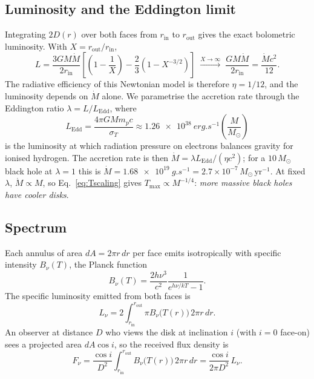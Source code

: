 \documentclass[11pt,a4paper]{article}
\newcommand{\Msun}{M_\odot}
\newcommand{\Mdot}{\dot M}
\newcommand{\LEdd}{L_{\mathrm{Edd}}}
\newcommand{\rin}{r_{\mathrm{in}}}
\newcommand{\rout}{r_{\mathrm{out}}}
\newcommand{\Tmax}{T_{\max}}
\begin{document}
\subsection{Luminosity and the Eddington limit}
Integrating $2D(r)$ over both faces from $\rin$ to $\rout$ gives the exact
bolometric luminosity. With $X=\rout/\rin$,
\begin{equation}
  L=\frac{3GM\Mdot}{2\rin}\left[\left(1-\frac{1}{X}\right)-\frac{2}{3}\left(1-X^{-3/2}\right)\right]
  \;\xrightarrow{X\to\infty}\;\frac{GM\Mdot}{2\rin}=\frac{\Mdot c^2}{12}.
  \label{eq:Lanalytic}
\end{equation}
The radiative efficiency of this Newtonian model is therefore $\eta=1/12$,
and the luminosity depends on $\Mdot$ alone. We parametrise the accretion
rate through the Eddington ratio $\lambda=L/\LEdd$, where
\begin{equation}
  \LEdd=\frac{4\pi GMm_pc}{\sigma_T}\approx\SI{1.26e38}{erg.s^{-1}}\left(\frac{M}{\Msun}\right)
\end{equation}
is the luminosity at which radiation pressure on electrons balances gravity
for ionised hydrogen. The accretion rate is then
$\Mdot=\lambda\LEdd/(\eta c^2)$; for a $10\,\Msun$ black hole at
$\lambda=1$ this is $\Mdot=\SI{1.68e19}{g.s^{-1}}=2.7\times10^{-7}\,\Msun\,\mathrm{yr}^{-1}$.
At fixed $\lambda$, $\Mdot\propto M$, so Eq.~\eqref{eq:Tscaling} gives
$\Tmax\propto M^{-1/4}$: \emph{more massive black holes have cooler disks}.

\subsection{Spectrum}
Each annulus of area $dA=2\pi r\,dr$ per face emits isotropically with
specific intensity $B_\nu(T)$, the Planck function \citep{RybickiLightman1979}
\begin{equation}
  B_\nu(T)=\frac{2h\nu^3}{c^2}\frac{1}{e^{h\nu/kT}-1}.
\end{equation}
The specific luminosity emitted from both faces is
\begin{equation}
  L_\nu=2\int_{\rin}^{\rout}\pi B_\nu\bigl(T(r)\bigr)\,2\pi r\,dr.
  \label{eq:Lnu}
\end{equation}
An observer at distance $D$ who views the disk at inclination $i$ (with
$i=0$ face-on) sees a projected area $dA\cos i$, so the received flux
density is
\begin{equation}
  F_\nu=\frac{\cos i}{D^2}\int_{\rin}^{\rout}B_\nu\bigl(T(r)\bigr)\,2\pi r\,dr
       =\frac{\cos i}{2\pi D^2}\,L_\nu .
  \label{eq:Fnu}
\end{equation}
\end{document}
